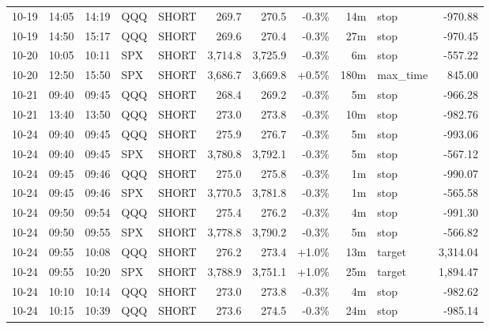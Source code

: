 \documentclass[11pt,a4paper,twoside]{article}
\begin{document}
\begin{center}
\begin{longtable}{>{\color{txtmain}}l l l l l r r r r >{\color{txtmain}}l r}
10-19 & 14:05 & 14:19 & QQQ & SHORT & 269.7 & 270.5 & \textcolor{lossred}{-0.3\%} & 14m & stop & \textcolor{lossred}{-970.88} \\
10-19 & 14:50 & 15:17 & QQQ & SHORT & 269.6 & 270.4 & \textcolor{lossred}{-0.3\%} & 27m & stop & \textcolor{lossred}{-970.45} \\
10-20 & 10:05 & 10:11 & SPX & SHORT & 3,714.8 & 3,725.9 & \textcolor{lossred}{-0.3\%} & 6m & stop & \textcolor{lossred}{-557.22} \\
10-20 & 12:50 & 15:50 & SPX & SHORT & 3,686.7 & 3,669.8 & \textcolor{wingreen}{+0.5\%} & 180m & max\_time & \textcolor{wingreen}{845.00} \\
10-21 & 09:40 & 09:45 & QQQ & SHORT & 268.4 & 269.2 & \textcolor{lossred}{-0.3\%} & 5m & stop & \textcolor{lossred}{-966.28} \\
10-21 & 13:40 & 13:50 & QQQ & SHORT & 273.0 & 273.8 & \textcolor{lossred}{-0.3\%} & 10m & stop & \textcolor{lossred}{-982.76} \\
10-24 & 09:40 & 09:45 & QQQ & SHORT & 275.9 & 276.7 & \textcolor{lossred}{-0.3\%} & 5m & stop & \textcolor{lossred}{-993.06} \\
10-24 & 09:40 & 09:45 & SPX & SHORT & 3,780.8 & 3,792.1 & \textcolor{lossred}{-0.3\%} & 5m & stop & \textcolor{lossred}{-567.12} \\
10-24 & 09:45 & 09:46 & QQQ & SHORT & 275.0 & 275.8 & \textcolor{lossred}{-0.3\%} & 1m & stop & \textcolor{lossred}{-990.07} \\
10-24 & 09:45 & 09:46 & SPX & SHORT & 3,770.5 & 3,781.8 & \textcolor{lossred}{-0.3\%} & 1m & stop & \textcolor{lossred}{-565.58} \\
10-24 & 09:50 & 09:54 & QQQ & SHORT & 275.4 & 276.2 & \textcolor{lossred}{-0.3\%} & 4m & stop & \textcolor{lossred}{-991.30} \\
10-24 & 09:50 & 09:55 & SPX & SHORT & 3,778.8 & 3,790.2 & \textcolor{lossred}{-0.3\%} & 5m & stop & \textcolor{lossred}{-566.82} \\
10-24 & 09:55 & 10:08 & QQQ & SHORT & 276.2 & 273.4 & \textcolor{wingreen}{+1.0\%} & 13m & target & \textcolor{wingreen}{3,314.04} \\
10-24 & 09:55 & 10:20 & SPX & SHORT & 3,788.9 & 3,751.1 & \textcolor{wingreen}{+1.0\%} & 25m & target & \textcolor{wingreen}{1,894.47} \\
10-24 & 10:10 & 10:14 & QQQ & SHORT & 273.0 & 273.8 & \textcolor{lossred}{-0.3\%} & 4m & stop & \textcolor{lossred}{-982.62} \\
10-24 & 10:15 & 10:39 & QQQ & SHORT & 273.6 & 274.5 & \textcolor{lossred}{-0.3\%} & 24m & stop & \textcolor{lossred}{-985.14} \\

\end{longtable}
\end{center}
\end{document}
